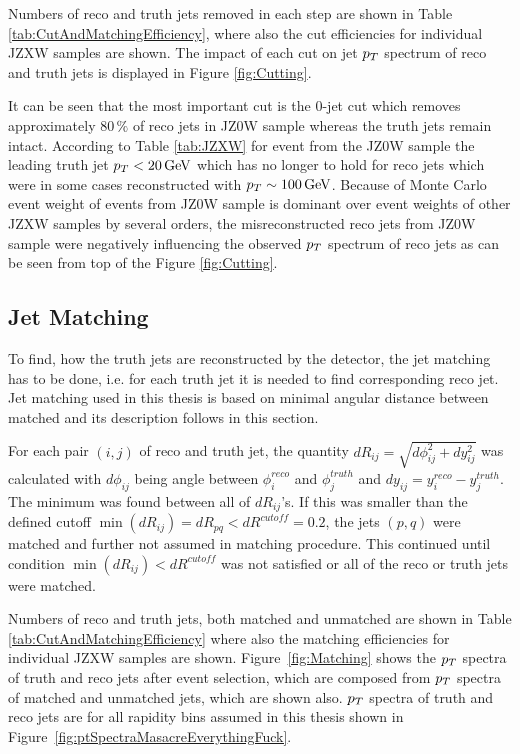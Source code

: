 Numbers of reco and truth jets removed in each step are shown in Table
\ref{tab:CutAndMatchingEfficiency}, where also the cut efficiencies for individual
JZXW samples are shown. The impact of each cut on jet $p_{T}$ spectrum of reco
and truth jets is displayed in Figure \ref{fig:Cutting}. 

It can be seen that the most important cut is the 0-jet cut which removes
approximately $80\,\%$ of reco jets in JZ0W sample whereas the truth jets
remain intact. According to Table \ref{tab:JZXW} for event from the JZ0W sample
the leading truth jet $p_{T} < 20 \,\text{GeV}$ which has no longer to hold for reco
jets which were in some cases reconstructed with $p_{T} \sim 100 \,\text{GeV}$. Because of
Monte Carlo event weight of events from JZ0W sample is dominant over event
weights of other JZXW samples by several orders, the misreconstructed reco
jets from JZ0W sample were negatively influencing the observed $p_{T}$ spectrum of
reco jets as can be seen from top of the Figure \ref{fig:Cutting}.

\subsection{Jet Matching}
\label{SubSec:JetMatching}

To find, how the truth jets are reconstructed by the detector, the jet matching
has to be done, i.e. for each truth jet it is needed to find corresponding reco
jet. Jet matching used in this thesis is based on minimal angular distance
between matched and its description follows in this section.

For each pair $(i,j)$ of reco and truth jet, the quantity $dR_{ij} =
\sqrt{d\phi_{ij}^2 + dy_{ij}^2}$ was calculated with $d\phi_{ij}$ being angle
between $\phi_i^{reco}$ and $\phi_j^{truth}$ and $dy_{ij} = y_i^{reco} -
y_j^{truth}$.  The minimum was found between all of $dR_{ij}$'s. If this was
smaller than the defined cutoff $\min(dR_{ij}) = dR_{pq} < dR^{cutoff} = 0.2$,
the jets $(p,q)$ were matched and further not assumed in matching procedure.
This continued until condition $\min(dR_{ij}) < dR^{cutoff}$ was not satisfied
or all of the reco or truth jets were matched.

Numbers of reco and truth jets, both matched and unmatched are shown in Table
\ref{tab:CutAndMatchingEfficiency} where also the matching efficiencies for
individual JZXW samples are shown. Figure~\ref{fig:Matching} shows the $p_{T}$
spectra of truth and reco jets after event selection, which are composed from
$p_{T}$ spectra of matched and unmatched jets, which are shown also. $p_{T}$ spectra
of truth and reco jets are for all rapidity bins assumed in this thesis shown in
Figure~\ref{fig:ptSpectraMasacreEverythingFuck}.

